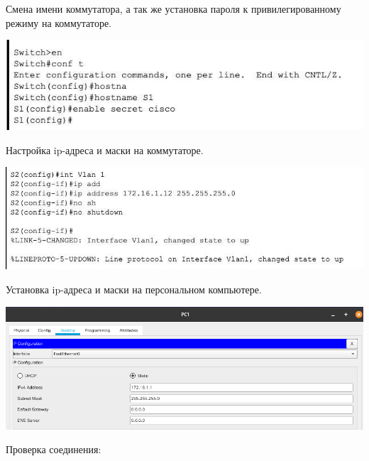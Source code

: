 \documentclass[a4paper,14pt]{extarticle}
\begin{document}
    Смена имени коммутатора, а так же установка пароля к привилегированному
    режиму на коммутаторе. 
    \begin{center}
        \includegraphics{5}
    \end{center}
    \newpage
    \par Настройка ip-адреса и маски на коммутаторе.
    \begin{center}
        \includegraphics[scale=0.8]{4.jpg}
    \end{center}
    \par Установка ip-адреса и маски на персональном компьютере.
    \begin{center}
        \includegraphics[scale=0.5]{6.png}
    \end{center}
    \par Проверка соединения:
\end{document}
